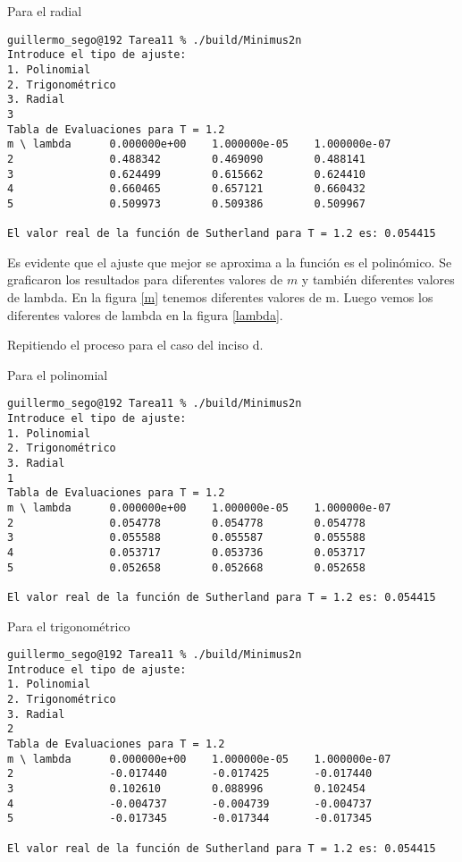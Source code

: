 \documentclass{article}
\begin{document}
Para el radial
\begin{lstlisting}
guillermo_sego@192 Tarea11 % ./build/Minimus2n
Introduce el tipo de ajuste:
1. Polinomial
2. Trigonométrico
3. Radial
3
Tabla de Evaluaciones para T = 1.2
m \ lambda      0.000000e+00    1.000000e-05    1.000000e-07
2               0.488342        0.469090        0.488141
3               0.624499        0.615662        0.624410
4               0.660465        0.657121        0.660432
5               0.509973        0.509386        0.509967

El valor real de la función de Sutherland para T = 1.2 es: 0.054415
\end{lstlisting}

Es evidente que el ajuste que mejor se aproxima a la función es el polinómico. 
Se graficaron los resultados para diferentes valores de $m$ y también diferentes valores de lambda. En la figura \ref{m} tenemos diferentes valores de m. Luego vemos los diferentes valores de lambda en la figura \ref{lambda}.

Repitiendo el proceso para el caso del inciso d. 

Para el polinomial
\begin{lstlisting}
guillermo_sego@192 Tarea11 % ./build/Minimus2n
Introduce el tipo de ajuste:
1. Polinomial
2. Trigonométrico
3. Radial
1
Tabla de Evaluaciones para T = 1.2
m \ lambda      0.000000e+00    1.000000e-05    1.000000e-07
2               0.054778        0.054778        0.054778
3               0.055588        0.055587        0.055588
4               0.053717        0.053736        0.053717
5               0.052658        0.052668        0.052658

El valor real de la función de Sutherland para T = 1.2 es: 0.054415
\end{lstlisting}

Para el trigonométrico
\begin{lstlisting}
guillermo_sego@192 Tarea11 % ./build/Minimus2n
Introduce el tipo de ajuste:
1. Polinomial
2. Trigonométrico
3. Radial
2
Tabla de Evaluaciones para T = 1.2
m \ lambda      0.000000e+00    1.000000e-05    1.000000e-07
2               -0.017440       -0.017425       -0.017440
3               0.102610        0.088996        0.102454
4               -0.004737       -0.004739       -0.004737
5               -0.017345       -0.017344       -0.017345

El valor real de la función de Sutherland para T = 1.2 es: 0.054415
\end{lstlisting}
\end{document}

